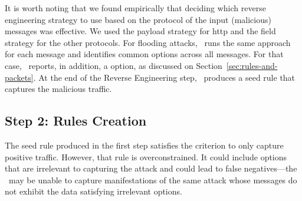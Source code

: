 \documentclass[sigconf,review, anonymous]{acmart}
\begin{document}
It is worth noting that we found empirically that deciding which
reverse engineering strategy to use based on the protocol of the input
(malicious) messages was effective. We used the payload strategy for
http and the field strategy for the other protocols. For flooding
attacks, \tname\ runs the same approach for each message and
identifies common options across all messages. For that case,
\tname\ reports, in addition, a  option, as
discussed on Section~\ref{sec:rules-and-packets}.  At the end of the
Reverse Engineering step, \tname\ produces a seed rule that captures
the malicious traffic.





\subsection{Step 2: Rules Creation}
\label{sec:minimization}

The seed rule produced in the first step satisfies the criterion to
only capture positive traffic. However, that rule is overconstrained.
It could include options that are irrelevant to capturing the attack
and could lead to false negatives---the \nids\ may be unable to
capture manifestations of the same attack whose messages do not
exhibit the data satisfying irrelevant options.

\end{document}
